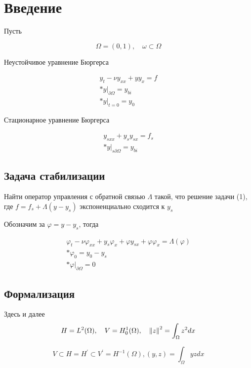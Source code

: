 \section{Введение}

Пусть

\begin{equation}
    \Omega = (0, 1), \quad \omega \subset \Omega
\end{equation}

Неустойчивое уравнение Бюргерса

\begin{gather}
    y_t - \nu y_{xx} + yy_x = f \\*
    y|_{\partial \Omega} = y_{bi} \\*
    y|_{t=0} = y_0
\end{gather}

Стационарное уравнение Бюргерса

\begin{gather}
    y_{sxx} + y_s y_{sx} = f_s \\*
    y|_{s \partial \Omega} = y_{bi}
\end{gather}

\subsection{Задача стабилизации}
Найти оператор управления с обратной связью $\Lambda$ такой, что решение задачи
(1), где $f = f_s + \Lambda (y - y_s)$ экспоненциально сходится к $y_s$

Обозначим за $\varphi = y - y_s$, тогда

\begin{gather}
    \varphi_t - \nu \varphi_{xx} + y_s \varphi_x + \varphi y_{sx} + \varphi
    \varphi_x = \Lambda(\varphi) \\*
    \varphi_0 = y_0 - y_s \\*
    \varphi|_{\partial \Omega} = 0
\end{gather}

\subsection{Формализация}
Здесь и далее
\begin{equation}
    H = L^2(\Omega), \quad V = H^1_0(\Omega), \quad \left\lVert z\right\rVert^2 = \int_{\Omega}{z^2dx}
\end{equation}

\begin{equation}
    V \subset H = H^{'} \subset V^{'} = H^{-1}(\Omega), (y, z) =
    \int_{\Omega}{yzdx}
\end{equation}

